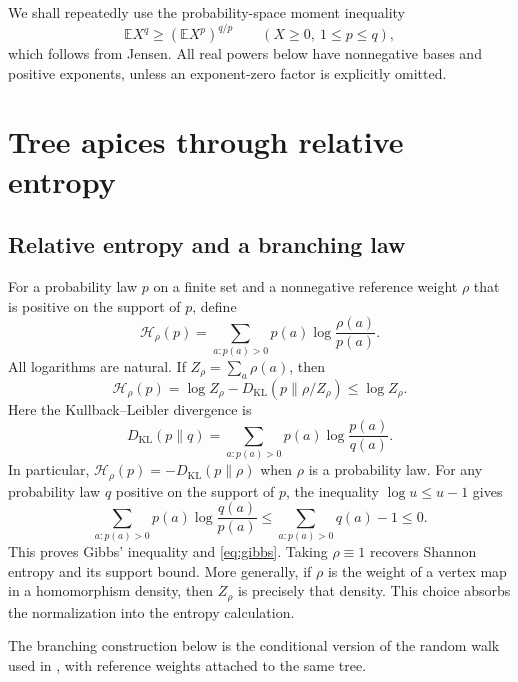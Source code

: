 \documentclass[11pt,a4paper]{article}
\theoremstyle{remark}
\numberwithin{equation}{section}
\newcommand{\E}{\mathbb E}
\begin{document}
We shall repeatedly use the probability-space moment inequality
\begin{equation}\label{eq:moments}
 \E X^q\geq(\E X^p)^{q/p}
 \qquad(X\geq0,\ 1\leq p\leq q),
\end{equation}
which follows from Jensen. All real powers below have nonnegative
bases and positive exponents, unless an exponent-zero factor is
explicitly omitted.

\section{Tree apices through relative entropy}\label{sec:trees}

\subsection{Relative entropy and a branching law}

For a probability law $p$ on a finite set and a nonnegative
reference weight $\rho$ that is positive on the support of $p$,
define
\begin{equation}\label{eq:relative-entropy}
 \mathcal H_\rho(p)=\sum_{a:p(a)>0}
                    p(a)\log\frac{\rho(a)}{p(a)}.
\end{equation}
All logarithms are natural. If $Z_\rho=\sum_a\rho(a)$, then
\begin{equation}\label{eq:gibbs}
 \mathcal H_\rho(p)
 =\log Z_\rho-D_{\mathrm{KL}}(p\|\rho/Z_\rho)
 \leq\log Z_\rho.
\end{equation}
Here the Kullback--Leibler divergence is
\[
 D_{\mathrm{KL}}(p\|q)=\sum_{a:p(a)>0}p(a)\log\frac{p(a)}{q(a)}.
\]
In particular, $\mathcal H_\rho(p)=-D_{\mathrm{KL}}(p\|\rho)$
when $\rho$ is a probability law.
For any probability law $q$ positive on the support of $p$,
the inequality $\log u\leq u-1$ gives
\[
 \sum_{a:p(a)>0}p(a)\log\frac{q(a)}{p(a)}
 \leq\sum_{a:p(a)>0}q(a)-1\leq0.
\]
This proves Gibbs' inequality and \eqref{eq:gibbs}.
Taking $\rho\equiv1$ recovers Shannon entropy and its support
bound. More generally, if $\rho$ is the weight of a vertex map
in a homomorphism density, then $Z_\rho$ is precisely that
density. This choice absorbs the normalization into the entropy
calculation.

The branching construction below is the conditional version of
the random walk used in \cite[Section~2]{CKLL}, with reference
weights attached to the same tree.
\end{document}
